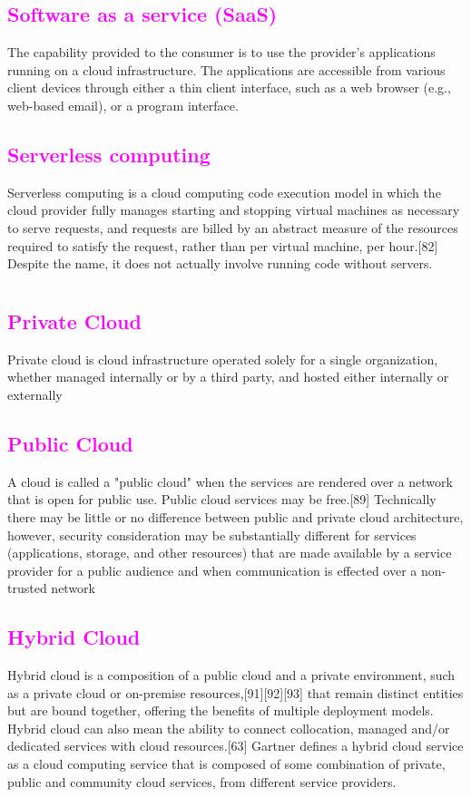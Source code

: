 \documentclass[11pt]{article}
\begin{document}
\subsection{\textcolor{magenta}{Software as a service (SaaS)}}
The capability provided to the consumer is to use the provider's applications running on a cloud infrastructure. The applications are accessible from various client devices through either a thin client interface, such as a web browser (e.g., web-based email), or a program interface.
\subsection{\textcolor{magenta}{Serverless computing}}
Serverless computing is a cloud computing code execution model in which the cloud provider fully manages starting and stopping virtual machines as necessary to serve requests, and requests are billed by an abstract measure of the resources required to satisfy the request, rather than per virtual machine, per hour.[82] Despite the name, it does not actually involve running code without servers.
\section{\color{green}{Deployment models}}
\subsection{\textcolor{magenta}{Private Cloud}}
Private cloud is cloud infrastructure operated solely for a single organization, whether managed internally or by a third party, and hosted either internally or externally
\subsection{\textcolor{magenta}{Public Cloud}}
A cloud is called a "public cloud" when the services are rendered over a network that is open for public use. Public cloud services may be free.[89] Technically there may be little or no difference between public and private cloud architecture, however, security consideration may be substantially different for services (applications, storage, and other resources) that are made available by a service provider for a public audience and when communication is effected over a non-trusted network
\subsection{\textcolor{magenta}{Hybrid Cloud}}
Hybrid cloud is a composition of a public cloud and a private environment, such as a private cloud or on-premise resources,[91][92][93] that remain distinct entities but are bound together, offering the benefits of multiple deployment models. Hybrid cloud can also mean the ability to connect collocation, managed and/or dedicated services with cloud resources.[63] Gartner defines a hybrid cloud service as a cloud computing service that is composed of some combination of private, public and community cloud services, from different service providers.
\end{document}
